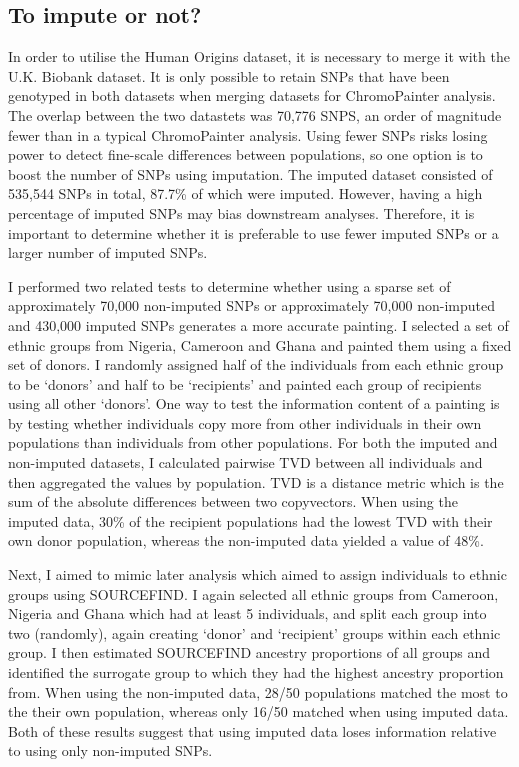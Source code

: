 \subsection{To impute or not?}

In order to utilise the Human Origins dataset, it is necessary to merge it with the U.K. Biobank dataset. It is only possible to retain SNPs that have been genotyped in both datasets when merging datasets for ChromoPainter analysis. The overlap between the two datastets was 70,776 SNPS, an order of magnitude fewer than in a typical ChromoPainter analysis. Using fewer SNPs risks losing power to detect fine-scale differences between populations, so one option is to boost the number of SNPs using imputation. The imputed dataset consisted of 535,544 SNPs in total, 87.7\% of which were imputed. However, having a high percentage of imputed SNPs may bias downstream analyses. Therefore, it is important to determine whether it is preferable to use fewer imputed SNPs or a larger number of imputed SNPs.

I performed two related tests to determine whether using a sparse set of approximately 70,000 non-imputed SNPs or approximately 70,000 non-imputed and 430,000 imputed SNPs generates a more accurate painting. I selected a set of ethnic groups from Nigeria, Cameroon and Ghana and painted them using a fixed set of donors. I randomly assigned half of the individuals from each ethnic group to be `donors' and half to be `recipients' and painted each group of recipients using all other `donors'. One way to test the information content of a painting is by testing whether individuals copy more from other individuals in their own populations than individuals from other populations. For both the imputed and non-imputed datasets, I calculated pairwise TVD between all individuals and then aggregated the values by population. TVD is a distance metric which is the sum of the absolute differences between two copyvectors. When using the imputed data, 30\% of the recipient populations had the lowest TVD with their own donor population, whereas the non-imputed data yielded a value of 48\%. 

Next, I aimed to mimic later analysis which aimed to assign individuals to ethnic groups using SOURCEFIND. I again selected all ethnic groups from Cameroon, Nigeria and Ghana which had at least 5 individuals, and split each group into two (randomly), again creating `donor' and `recipient' groups within each ethnic group. I then estimated SOURCEFIND ancestry proportions of all groups and identified the surrogate group to which they had the highest ancestry proportion from. When using the non-imputed data, 28/50 populations matched the most to the their own population, whereas only 16/50 matched when using imputed data. Both of these results suggest that using imputed data loses information relative to using only non-imputed SNPs.

